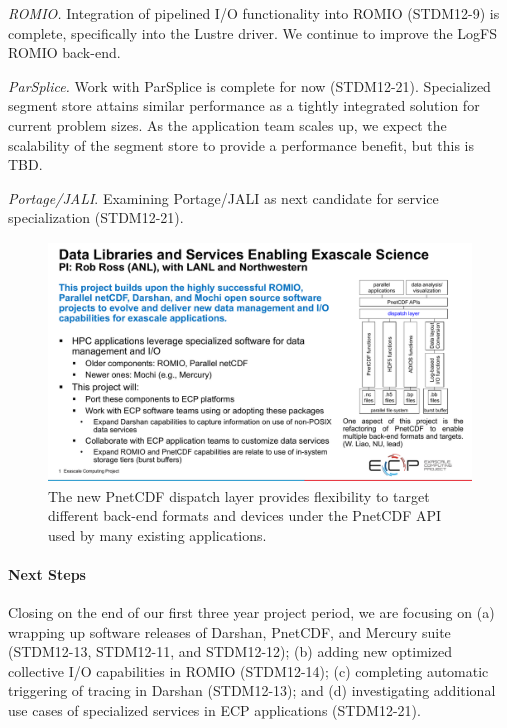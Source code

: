 \emph{ROMIO.}
Integration of pipelined I/O functionality into ROMIO (STDM12-9) is complete,
specifically into the Lustre driver. We continue to improve the LogFS
ROMIO back-end.

\emph{ParSplice.}
Work with ParSplice is complete for now (STDM12-21). Specialized segment
store attains similar performance as a tightly integrated solution for
current problem sizes. As the application team scales up, we expect
the scalability of the segment store to provide a performance benefit,
but this is TBD.

\emph{Portage/JALI}. Examining Portage/JALI as next candidate for service
specialization (STDM12-21).

\begin{figure}[htb]
        \centering
        \includegraphics[height=2.5in]{projects/2.3.4-DataViz/2.3.4.10-DataLib/pnetcdf-figure.pdf}
        \caption{\label{fig:pnetcdf} The new PnetCDF dispatch layer provides flexibility to target different back-end formats and devices under the PnetCDF API used by many existing applications.
        }
\end{figure}

\paragraph{Next Steps}
Closing on the end of our first three year project period, we are focusing
on (a) wrapping up software releases of Darshan, PnetCDF, and Mercury
suite (STDM12-13, STDM12-11, and STDM12-12); (b) adding new optimized
collective I/O capabilities in ROMIO (STDM12-14); (c) completing automatic
triggering of tracing in Darshan (STDM12-13); and (d) investigating
additional use cases of specialized services in ECP applications
(STDM12-21). 

